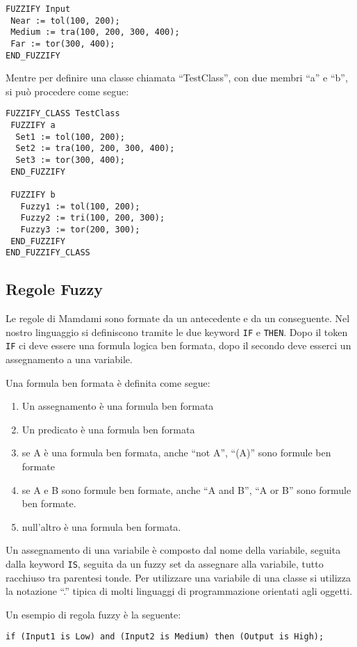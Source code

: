 \begin{verbatim}
FUZZIFY Input
 Near := tol(100, 200);
 Medium := tra(100, 200, 300, 400);
 Far := tor(300, 400);
END_FUZZIFY
\end{verbatim}

Mentre per definire una classe chiamata ``TestClass'', con due membri ``a'' e ``b'', si può procedere come segue:

\begin{verbatim}
FUZZIFY_CLASS TestClass
 FUZZIFY a
  Set1 := tol(100, 200);
  Set2 := tra(100, 200, 300, 400);
  Set3 := tor(300, 400);
 END_FUZZIFY
 
 FUZZIFY b
   Fuzzy1 := tol(100, 200);
   Fuzzy2 := tri(100, 200, 300);
   Fuzzy3 := tor(200, 300);
 END_FUZZIFY
END_FUZZIFY_CLASS
\end{verbatim}


\subsection{Regole Fuzzy}
Le regole di Mamdami sono formate da un antecedente e da un conseguente. Nel nostro linguaggio si definiscono tramite le due keyword \verb|IF| e \verb|THEN|.
Dopo il token \verb|IF| ci deve essere una formula logica ben formata, dopo il secondo deve esserci un assegnamento a una variabile.

Una formula ben formata è definita come segue:
\begin{enumerate}
 \item Un assegnamento è una formula ben formata
 \item Un predicato è una formula ben formata
 \item se A è una formula ben formata, anche ``not A'', ``(A)'' sono formule ben formate
 \item se A e B sono formule ben formate, anche ``A and B'', ``A or B'' sono formule ben formate.
 \item null'altro è una formula ben formata.
\end{enumerate}

Un assegnamento di una variabile è composto dal nome della variabile, seguita dalla keyword \verb|IS|, seguita da un fuzzy set da assegnare alla variabile, tutto racchiuso tra parentesi tonde. Per utilizzare una variabile di una classe si utilizza la notazione ``.'' tipica di molti linguaggi di programmazione orientati agli oggetti.

Un esempio di regola fuzzy è la seguente:

\begin{verbatim}
if (Input1 is Low) and (Input2 is Medium) then (Output is High); 
\end{verbatim}




